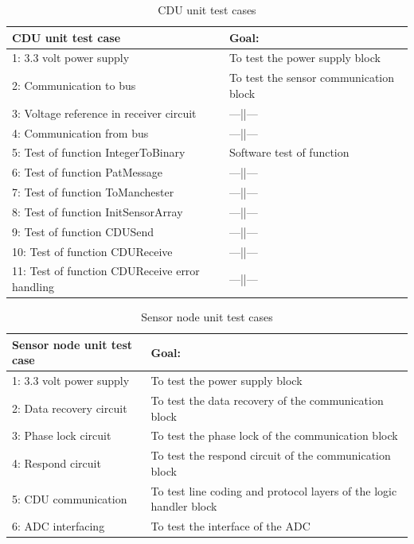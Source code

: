 \begin{table}[H]
	\centering
    \begin{tabular}{|p{6.5cm}|p{7.5cm}|}
    \hline
    CDU unit test case                             & Goal: \\ \hline
    1: 3.3 volt power supply                       & To test the power supply block\\ \hline
    2: Communication to bus                        & To test the sensor communication block     \\ \hline
    3: Voltage reference in receiver circuit       & ---||---     \\ \hline
    4: Communication from bus                      & ---||---     \\ \hline
    5: Test of function IntegerToBinary            & Software test of function     \\ \hline
    6: Test of function PatMessage                 & ---||---     \\ \hline
    7: Test of function ToManchester               & ---||---     \\ \hline
    8: Test of function InitSensorArray            & ---||---     \\ \hline
    9: Test of function CDUSend                    & ---||---     \\ \hline
    10: Test of function CDUReceive                & ---||---     \\ \hline
    11: Test of function CDUReceive error handling & ---||---     \\ \hline
    \end{tabular}
    \caption{CDU unit test cases}
    \label{tab:cduutc}
\end{table}
\begin{table}[H]
	\centering
    \begin{tabular}{|p{5.5cm}|p{8.5cm}|}
    \hline
    Sensor node unit test case                  & Goal: \\ \hline
    1: 3.3 volt power supply                    & To test the power supply block\\ \hline
    2: Data recovery circuit                 	& To test the data recovery of the communication block     \\ \hline
    3: Phase lock circuit               		& To test the phase lock of the communication block     \\ \hline
    4: Respond circuit               			& To test the respond circuit of the communication block     \\ \hline
    5: CDU communication                        & To test line coding and protocol layers of the logic handler block\\ \hline
    6: ADC interfacing 							& To test the interface of the ADC     \\ \hline 
    \end{tabular}
    \caption{Sensor node unit test cases}
    \label{tab:SNUT}
\end{table}

